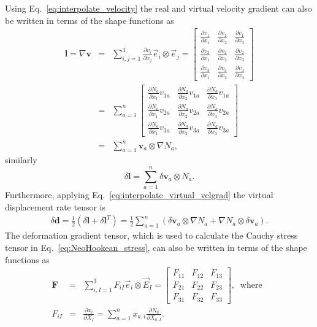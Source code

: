 \documentclass[12pt,aps,pre]{revtex4}
\begin{document}
Using Eq.\ \eqref{eq:interpolate_velocity} the real and virtual velocity gradient can also be written in terms of the shape functions as
%
\begin{eqnarray}
\pmb{l} = \nabla \pmb{v} &=& \sum_{i,j=1}^3 \frac{\partial v_i}{\partial x_j} \vec{e}_i \otimes \vec{e}_j = \begin{bmatrix}
\frac{\partial v_1}{\partial x_1} & \frac{\partial v_1}{\partial x_2} & \frac{\partial v_1}{\partial x_3} \\
\frac{\partial v_2}{\partial x_1} & \frac{\partial v_2}{\partial x_2} & \frac{\partial v_2}{\partial x_3} \\
\frac{\partial v_3}{\partial x_1} & \frac{\partial v_3}{\partial x_2} & \frac{\partial v_3}{\partial x_3} 
\end{bmatrix} \nonumber\\
%
&=&\sum_{a=1}^n \begin{bmatrix}
\frac{\partial N_a }{\partial x_1}v_{1a} & \frac{\partial N_a}{\partial x_2}v_{1a} & \frac{\partial N_a}{\partial x_3}v_{1a} \\
\frac{\partial N_a }{\partial x_1}v_{2a} & \frac{\partial N_a}{\partial x_2}v_{2a} & \frac{\partial N_a}{\partial x_3}v_{2a} \\
\frac{\partial N_a }{\partial x_1}v_{3a} & \frac{\partial N_a}{\partial x_2}v_{3a} & \frac{\partial N_a}{\partial x_3}v_{3a} 
\end{bmatrix} \nonumber\\
%
&=& \sum_{a=1}^n \pmb{v}_a \otimes \nabla N_a,
\label{eq:interpolate_velgrad}
\end{eqnarray}
%
similarly
%
\begin{equation}
\delta \pmb{l} = \sum_{a=1}^n \delta \pmb{v}_a \otimes N_a.
\label{eq:interpolate_virtual_velgrad}
\end{equation}
%
Furthermore, applying Eq.\ \eqref{eq:interpolate_virtual_velgrad} the virtual displacement rate tensor is
%
\begin{eqnarray}
\delta \pmb{d} = \frac{1}{2}\left(\delta \pmb{l} + \delta \pmb{l}^T\right) = \frac{1}{2}\sum_{a=1}^n \left(\delta \pmb{v}_a \otimes \nabla N_a + \nabla N_a \otimes \delta \pmb{v}_a\right).
\label{eq:interpolate_displacement_rate}
\end{eqnarray}
%
The deformation gradient tensor, which is used to calculate the Cauchy stress tensor in Eq.\ \eqref{eq:NeoHookean_stress}, can also be written in terms of the shape functions as
%
\begin{eqnarray}
\pmb{F} &=& \sum_{i,I=1}^3 F_{iI}\vec{e}_i \otimes \vec{E}_I =
%
\begin{bmatrix}
F_{11} & F_{12} & F_{13} \\
F_{21} & F_{22} & F_{23} \\
F_{31} & F_{32} & F_{33}
\end{bmatrix}, \ \text{ where } \ \nonumber\\
%
F_{iI} &=& \frac{\partial x_i}{\partial X_I} = \sum_{a=1}^nx_{a,i}\frac{\partial N_a }{\partial X_{a,I}}.
\end{eqnarray}
% 
\end{document}
